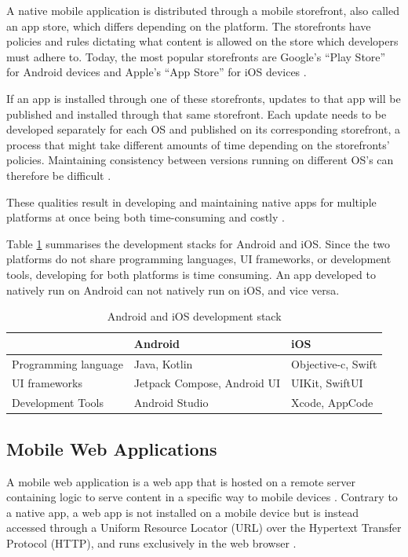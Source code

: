 \documentclass[a4paper,12pt]{article}
\begin{document}
A native mobile application is distributed through a mobile storefront, also called an app store, which differs depending on the platform. The storefronts have policies and rules dictating what content is allowed on the store which developers must adhere to. Today, the most popular storefronts are  Google’s “Play Store” for Android devices and Apple’s “App Store” for iOS devices \cite{numofapps_in_stores}.

If an app is installed through one of these storefronts, updates to that app will be published and installed through that same storefront. Each update needs to be developed separately for each OS and published on its corresponding storefront, a process that might take different amounts of time depending on the storefronts’ policies. Maintaining consistency between versions running on different OS’s can therefore be difficult \cite{comp_mobile_apps_crossplatform}.

These qualities result in developing and maintaining native apps for multiple platforms at once being both time-consuming and costly \cite{mobile_web_apps_2013}.

Table \ref{tab:devstack} summarises the development stacks for Android and iOS. Since the two platforms do not share programming languages, UI frameworks, or development tools, developing for both platforms is time consuming. An app developed to natively run on Android can not natively run on iOS, and vice versa.

\begin{table}[h]
\centering
{}
\begin{tabular}{|l|l|l|}
\hline
\rowcolor[HTML]{656565}
\multicolumn{1}{|c|}{\cellcolor[HTML]{656565}} & {\color[HTML]{FFFFFF} Android} & {\color[HTML]{FFFFFF} iOS} \\ \hline
Programming language & Java, Kotlin & Objective-c, Swift \\
UI frameworks & Jetpack Compose, Android UI & UIKit, SwiftUI \\
Development Tools & Android Studio & Xcode, AppCode \\ \hline
\end{tabular}
\caption{Android and iOS development stack \cite{mobile_tech_stacks}}
\label{tab:devstack}
\end{table}

\vspace{-4px}
\subsection{Mobile Web Applications} 
\label{Theory_mobileWebApps}
A mobile web application is a web app that is hosted on a remote server containing logic to serve content in a specific way to mobile devices \cite{crossplatform_2012, mobile_web_apps_2013}. Contrary to a native app, a web app is not installed on a mobile device but is instead accessed through a Uniform Resource Locator (URL) over the Hypertext Transfer Protocol (HTTP), and runs exclusively in the web browser \cite{crossplatform_taxonomy, crossplatform_2012}.
\end{document}
